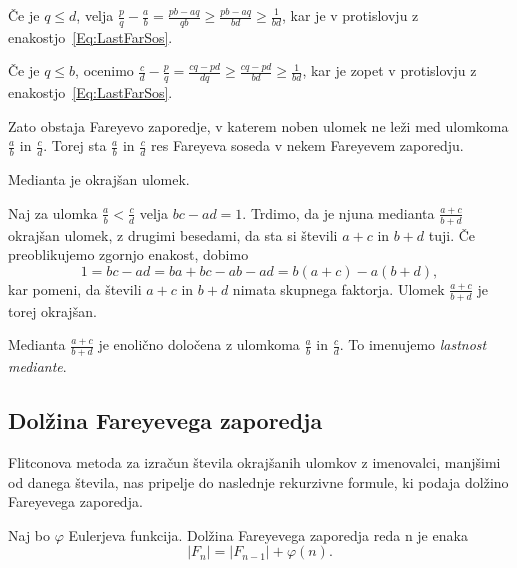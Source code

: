 \documentclass[mat1]{fmfdelo}
\begin{document}
\begin{dokaz}
Če je $q \leq d$, velja 
$ \frac{p}{q} - \frac{a}{b} = \frac{pb-aq}{qb} \geq \frac{pb-aq}{bd} \geq \frac{1}{bd} $,
kar je v protislovju z enakostjo~\ref{Eq:LastFarSos}.

Če je $q \leq b$, ocenimo
$ \frac{c}{d} - \frac{p}{q} = \frac{cq-pd}{dq} \geq \frac{cq-pd}{bd} \geq \frac{1}{bd} $,
kar je zopet v protislovju z enakostjo~\ref{Eq:LastFarSos}.

Zato obstaja Fareyevo zaporedje, v katerem noben ulomek ne leži med ulomkoma $\frac{a}{b}$ in $\frac{c}{d}$. Torej sta $\frac{a}{b}$ in $\frac{c}{d}$ res Fareyeva soseda v nekem Fareyevem zaporedju.
\end{dokaz}

\begin{lema}
\label{lema:MediantaOkrUlom}
Medianta je okrajšan ulomek.
\end{lema}

\begin{dokaz}
Naj za ulomka $\frac{a}{b} < \frac{c}{d}$ velja $bc - ad = 1$. Trdimo, da je njuna medianta $\frac{a+c}{b+d}$ okrajšan ulomek, z drugimi besedami, da sta si števili $a+c$ in $b+d$ tuji. Če preoblikujemo zgornjo enakost, dobimo 
\[ 1 = bc - ad = ba + bc - ab - ad = b(a + c) - a(b + d), \]
kar pomeni, da števili $a+c$ in $b+d$ nimata skupnega faktorja. Ulomek $\frac{a+c}{b+d}$ je torej okrajšan.
\end{dokaz}

\begin{opomba}
Medianta $\frac{a+c}{b+d}$ je enolično določena z ulomkoma $\frac{a}{b}$ in $\frac{c}{d}$. To imenujemo \emph{lastnost mediante}.
\end{opomba}

%
\subsection{Dolžina Fareyevega zaporedja}

Flitconova metoda za izračun števila okrajšanih ulomkov z imenovalci, manjšimi od danega števila, nas pripelje do naslednje rekurzivne formule, ki podaja dolžino Fareyevega zaporedja.

\begin{trditev}
\label{trd:DolzinaZap}
Naj bo $\varphi$ Eulerjeva funkcija. Dolžina Fareyevega zaporedja reda n je enaka
\begin{equation}
|F_{n}| = |F_{n-1}| + \varphi(n).
\end{equation}
\end{trditev}
\end{document}
